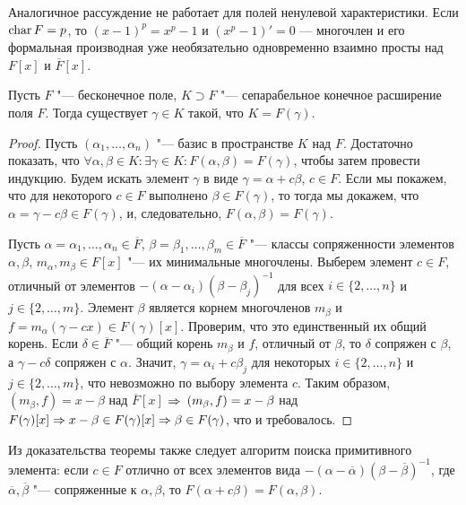 \begin{note}
	Аналогичное рассуждение не работает для полей ненулевой характеристики. Если $\operatorname{char}{F} = p$, то $(x - 1)^p = x^p - 1$ и $(x^p - 1)' = 0$ --- многочлен и его формальная производная уже необязательно одновременно взаимно просты над $F[x]$ и $\overline{F}[x]$.
\end{note}

\begin{theorem}
	Пусть $F$ "--- бесконечное поле, $K \supset F$ "--- сепарабельное конечное расширение поля $F$. Тогда существует $\gamma \in K$ такой, что $K = F(\gamma)$.
\end{theorem}

\begin{proof}
	Пусть $(\alpha_1, \dotsc, \alpha_n)$ "--- базис в пространстве $K$ над $F$. Достаточно показать, что $\forall \alpha, \beta \in K: \exists \gamma \in K: F(\alpha, \beta) = F(\gamma)$, чтобы затем провести индукцию. Будем искать элемент $\gamma$ в виде $\gamma = \alpha +c\beta$, $c \in F$. Если мы покажем, что для некоторого $c \in F$ выполнено $\beta \in F(\gamma)$, то тогда мы докажем, что $\alpha = \gamma - c\beta \in F(\gamma)$, и, следовательно, $F(\alpha, \beta) = F(\gamma)$.
	
	Пусть $\alpha = \alpha_1, \dotsc, \alpha_n \in \overline{F}$, $\beta = \beta_1, \dotsc, \beta_m \in \overline{F}$ "--- классы сопряженности элементов $\alpha, \beta$, $m_\alpha, m_\beta \in F[x]$ "--- их минимальные многочлены. Выберем элемент $c \in F$, отличный от элементов $-(\alpha - \alpha_i)(\beta - \beta_j)^{-1}$ для всех $i \in \{2, \dotsc, n\}$ и $j \in \{2, \dotsc, m\}$. Элемент $\beta$ является корнем многочленов $m_\beta$ и $f = m_\alpha(\gamma - cx) \in F(\gamma)[x]$. Проверим, что это единственный их общий корень. Если $\delta \in \overline{F}$ "--- общий корень $m_\beta$ и $f$, отличный от $\beta$, то $\delta$ сопряжен с $\beta$, а $\gamma - c\delta$ сопряжен с $\alpha$. Значит, $\gamma = \alpha_i + c\beta_j$ для некоторых $i \in \{2, \dotsc, n\}$ и $j \in \{2, \dotsc, m\}$, что невозможно по выбору элемента $c$. Таким образом, $(m_\beta, f) = x - \beta$ над $\overline{F}[x]$ $\Rightarrow$ $(m_\beta, f) \hm= x - \beta$ над $F(\gamma)[x] \Rightarrow x - \beta \in F(\gamma)[x] \Rightarrow \beta \in F(\gamma)$, что и требовалось.
\end{proof}

\begin{note}
	Из доказательства теоремы также следует алгоритм поиска примитивного элемента: если $c \in F$ отлично от всех элементов вида $-(\alpha - \overline{\alpha})(\beta - \overline{\beta})^{-1}$, где $\overline{\alpha}, \overline{\beta}$ "--- сопряженные к $\alpha, \beta$, то $F(\alpha + c\beta) = F(\alpha, \beta)$.
\end{note}